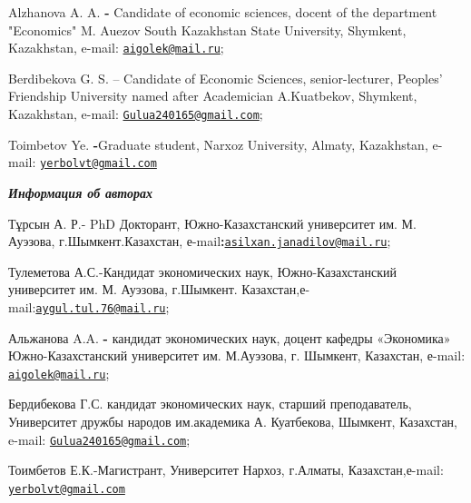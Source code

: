 Alzhanova A. A. {\bfseries -} Candidate of economic sciences, docent of the
department "Economics" M. Auezov South Kazakhstan State University,
Shymkent, Kazakhstan, e-mail:
\href{mailto:aigolek@mail.ru}{\nolinkurl{aigolek@mail.ru}};

Berdibekova G. S. -- Candidate of Economic Sciences, senior-lecturer,
Peoples'{} Friendship University named after Academician
A.Kuatbekov, Shymkent, Kazakhstan, e-mail:
\href{mailto:Gulua240165@gmail.com}{\nolinkurl{Gulua240165@gmail.com}};

Toimbetov Ye. {\bfseries -}Graduate student, Narxoz University, Almaty,
Kazakhstan, e-mail:
\href{mailto:yerbolvt@gmail.com}{\nolinkurl{yerbolvt@gmail.com}}

\emph{{\bfseries Информация об авторах}}

Тұрсын А. Р.- PhD Докторант, Южно-Казахстанский университет им. М.
Ауэзова, г.Шымкент.Казахстан,
е-mail{\bfseries :}\href{mailto:asilxan.janadilov@mail.ru}{\nolinkurl{asilxan.janadilov@mail.ru}};

Тулеметова А.С.-Кандидат экономических наук, Южно-Казахстанский
университет им. М. Ауэзова, г.Шымкент.
Казахстан,е-mail:\href{mailto:aygul.tul.76@mail.ru}{\nolinkurl{aygul.tul.76@mail.ru}};

Альжанова A.A. {\bfseries -} кандидат экономических наук, доцент кафедры
«Экономика» Южно-Казахстанский университет им. М.Ауэзова, г. Шымкент,
Казахстан, е-mail:
\href{mailto:aigolek@mail.ru}{\nolinkurl{aigolek@mail.ru}};

Бердибекова Г.С. кандидат экономических наук, старший преподаватель,
Университет дружбы народов им.академика А. Куатбекова, Шымкент,
Казахстан, e-mail:
\href{mailto:Gulua240165@gmail.com}{\nolinkurl{Gulua240165@gmail.com}};

Тоимбетов Е.К.-Магистрант, Университет Нархоз, г.Алматы,
Казахстан,е-mail:
\href{mailto:yerbolvt@gmail.com}{\nolinkurl{yerbolvt@gmail.com}}